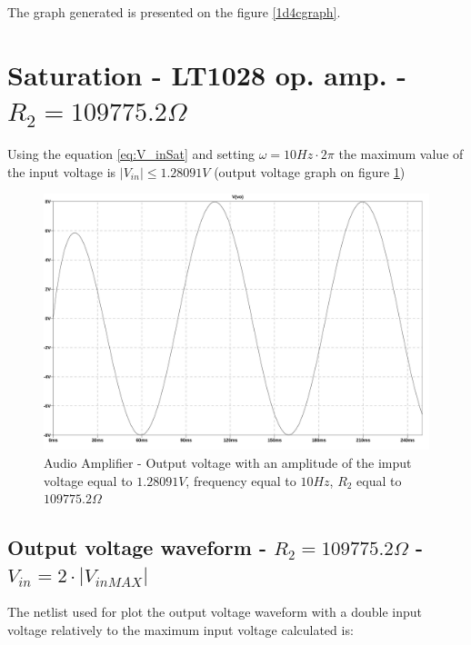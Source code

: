 \documentclass[10pt,a4paper]{book}
\begin{document}
The graph generated is presented on the figure \ref{1d4cgraph}.\\

\section{Saturation - LT1028 op. amp. - $R_2 = 109775.2\Omega$}
Using the equation \ref{eq:V_inSat} and setting $\omega = 10Hz \cdot 2\pi$ the maximum value of the input voltage is $|V_{in}| \leq 1.28091V$ (output voltage graph on figure \ref{1d5graph})

\begin{figure}[H]
  \centering
  \includegraphics[width=14cm]{graph/1d5.jpg}
  \caption{Audio Amplifier - Output voltage with an amplitude of the imput voltage equal to $1.28091V$, frequency equal to $10Hz$, $R_2$ equal to $109775.2\Omega$}
  \label{1d5graph}
\end{figure}

\subsection{Output voltage waveform - $R_2 = 109775.2\Omega$ - $V_{in} = 2 \cdot |V_{in MAX} |$}
The netlist used for plot the output voltage waveform with a double input voltage relatively to the maximum input voltage calculated is:\\

\end{document}
